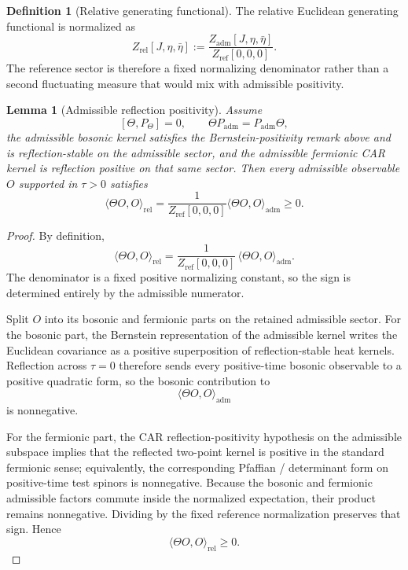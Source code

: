 \documentclass[11pt,a4paper]{article}
\newtheorem{lemma}[theorem]{Lemma}
\theoremstyle{definition}
\newtheorem{definition}[theorem]{Definition}
\theoremstyle{remark}
\newcommand{\Padm}{P_{\mathrm{adm}}}
\begin{document}
\begin{definition}[Relative generating functional]
\label{def:relative-generating-functional}
The relative Euclidean generating functional is normalized as
\[
Z_{\mathrm{rel}}[J,\eta,\bar\eta]
:=
\frac{Z_{\mathrm{adm}}[J,\eta,\bar\eta]}{Z_{\mathrm{ref}}[0,0,0]}.
\]
The reference sector is therefore a fixed normalizing denominator rather than a second fluctuating measure that would mix with admissible positivity.
\end{definition}

\begin{lemma}[Admissible reflection positivity]
\label{lem:admissible-reflection-positivity}
Assume
\[
[\Theta,P_\Theta]=0,
\qquad
\Theta\Padm=\Padm\Theta,
\]
the admissible bosonic kernel satisfies the Bernstein-positivity remark above and is
reflection-stable on the admissible sector, and the
admissible fermionic CAR kernel is reflection positive on that same sector. Then every
admissible observable $O$ supported in $\tau>0$ satisfies
\[
\langle \Theta O,O\rangle_{\mathrm{rel}}
=
\frac{1}{Z_{\mathrm{ref}}[0,0,0]}
\langle \Theta O,O\rangle_{\mathrm{adm}}
\ge 0.
\]
\end{lemma}

\begin{proof}
By definition,
\[
\langle \Theta O,O\rangle_{\mathrm{rel}}
=
\frac{1}{Z_{\mathrm{ref}}[0,0,0]}\,
\langle \Theta O,O\rangle_{\mathrm{adm}}.
\]
The denominator is a fixed positive normalizing constant, so the sign is determined entirely by the
admissible numerator.

Split $O$ into its bosonic and fermionic parts on the retained admissible sector. For the bosonic
part, the Bernstein representation of the admissible kernel writes the Euclidean covariance as a
positive superposition of reflection-stable heat kernels. Reflection across $\tau=0$ therefore sends
every positive-time bosonic observable to a positive quadratic form, so the bosonic contribution to
\[
\langle \Theta O,O\rangle_{\mathrm{adm}}
\]
is nonnegative.

For the fermionic part, the CAR reflection-positivity hypothesis on the admissible subspace implies
that the reflected two-point kernel is positive in the standard fermionic sense; equivalently, the
corresponding Pfaffian / determinant form on positive-time test spinors is nonnegative. Because the
bosonic and fermionic admissible factors commute inside the normalized expectation, their product
remains nonnegative. Dividing by the fixed reference normalization preserves that sign. Hence
\[
\langle \Theta O,O\rangle_{\mathrm{rel}}\ge 0.
\]
\end{proof}
\end{document}
